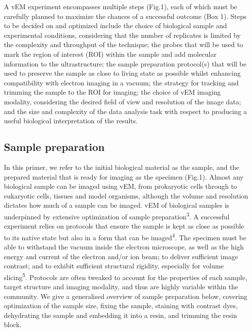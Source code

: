 \documentclass{article}
\begin{document}
A vEM experiment encompasses multiple steps (Fig.1), each of which must be carefully planned to maximize the chances of a successful outcome (Box 1). Steps to be decided on and optimized include the choice of biological sample and experimental conditions, considering that the number of replicates is limited by the complexity and throughput of the technique; the probes that will be used to mark the region of interest (ROI) within the sample and add molecular information to the ultrastructure; the sample preparation protocol(s) that will be used to preserve the sample as close to living state as possible whilst enhancing compatibility with electron imaging in a vacuum; the strategy for tracking and trimming the sample to the ROI for imaging; the choice of vEM imaging modality, considering the desired field of view and resolution of the image data; and the size and complexity of the data analysis task with respect to producing a useful biological interpretation of the results.

\subsection*{Sample preparation}

In this primer, we refer to the initial biological material as the sample, and the prepared material that is ready for imaging as the specimen (Fig.1). Almost any biological sample can be imaged using vEM, from prokaryotic cells through to eukaryotic cells, tissues and model organisms, although the volume and resolution dictates how much of a sample can be imaged. vEM of biological samples is underpinned by extensive optimization of sample preparation\textsuperscript{3}. A successful experiment relies on protocols that ensure the sample is kept as close as possible to its native state but also in a form that can be imaged\textsuperscript{4}. The specimen must be able to withstand the vacuum inside the electron microscope, as well as the high energy and current of the electron and/or ion beam; to deliver sufficient image contrast; and to exhibit sufficient structural rigidity, especially for volume slicing\textsuperscript{5}. Protocols are often tweaked to account for the properties of each sample, target structure and imaging modality, and thus are highly variable within the community. We give a generalised overview of sample preparation below, covering optimization of the sample size, fixing the sample, staining with contrast dyes, dehydrating the sample and embedding it into a resin, and trimming the resin block.
\end{document}
